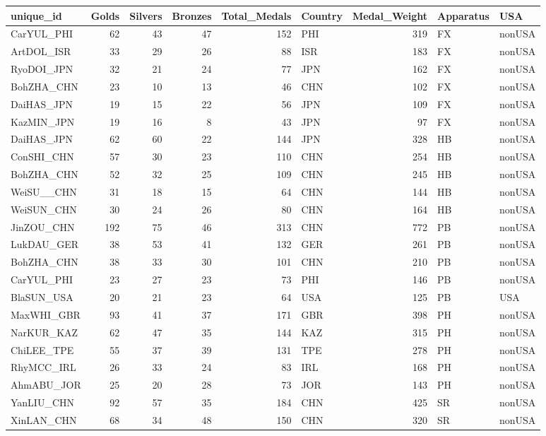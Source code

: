 \documentclass[
  letterpaper,
  DIV=11,
  numbers=noendperiod]{scrartcl}
\begin{document}
\begin{tabular}{l|r|r|r|r|l|r|l|l}
\hline
unique\_id & Golds & Silvers & Bronzes & Total\_Medals & Country & Medal\_Weight & Apparatus & USA\\
\hline
CarYUL\_PHI & 62 & 43 & 47 & 152 & PHI & 319 & FX & nonUSA\\
\hline
ArtDOL\_ISR & 33 & 29 & 26 & 88 & ISR & 183 & FX & nonUSA\\
\hline
RyoDOI\_JPN & 32 & 21 & 24 & 77 & JPN & 162 & FX & nonUSA\\
\hline
BohZHA\_CHN & 23 & 10 & 13 & 46 & CHN & 102 & FX & nonUSA\\
\hline
DaiHAS\_JPN & 19 & 15 & 22 & 56 & JPN & 109 & FX & nonUSA\\
\hline
KazMIN\_JPN & 19 & 16 & 8 & 43 & JPN & 97 & FX & nonUSA\\
\hline
DaiHAS\_JPN & 62 & 60 & 22 & 144 & JPN & 328 & HB & nonUSA\\
\hline
ConSHI\_CHN & 57 & 30 & 23 & 110 & CHN & 254 & HB & nonUSA\\
\hline
BohZHA\_CHN & 52 & 32 & 25 & 109 & CHN & 245 & HB & nonUSA\\
\hline
WeiSU\_\_CHN & 31 & 18 & 15 & 64 & CHN & 144 & HB & nonUSA\\
\hline
WeiSUN\_CHN & 30 & 24 & 26 & 80 & CHN & 164 & HB & nonUSA\\
\hline
JinZOU\_CHN & 192 & 75 & 46 & 313 & CHN & 772 & PB & nonUSA\\
\hline
LukDAU\_GER & 38 & 53 & 41 & 132 & GER & 261 & PB & nonUSA\\
\hline
BohZHA\_CHN & 38 & 33 & 30 & 101 & CHN & 210 & PB & nonUSA\\
\hline
CarYUL\_PHI & 23 & 27 & 23 & 73 & PHI & 146 & PB & nonUSA\\
\hline
BlaSUN\_USA & 20 & 21 & 23 & 64 & USA & 125 & PB & USA\\
\hline
MaxWHI\_GBR & 93 & 41 & 37 & 171 & GBR & 398 & PH & nonUSA\\
\hline
NarKUR\_KAZ & 62 & 47 & 35 & 144 & KAZ & 315 & PH & nonUSA\\
\hline
ChiLEE\_TPE & 55 & 37 & 39 & 131 & TPE & 278 & PH & nonUSA\\
\hline
RhyMCC\_IRL & 26 & 33 & 24 & 83 & IRL & 168 & PH & nonUSA\\
\hline
AhmABU\_JOR & 25 & 20 & 28 & 73 & JOR & 143 & PH & nonUSA\\
\hline
YanLIU\_CHN & 92 & 57 & 35 & 184 & CHN & 425 & SR & nonUSA\\
\hline
XinLAN\_CHN & 68 & 34 & 48 & 150 & CHN & 320 & SR & nonUSA\\

\end{tabular}
\end{document}
